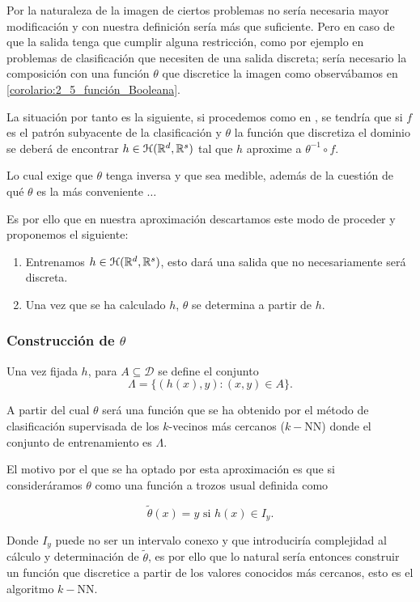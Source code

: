 Por la naturaleza de la imagen de ciertos problemas no sería 
necesaria mayor modificación y con nuestra definición sería 
más que suficiente. Pero en caso de que la salida tenga que cumplir alguna restricción, como por ejemplo en 
problemas de clasificación que necesiten de una salida discreta; sería necesario la composición con una función 
$\theta$ que discretice la imagen como observábamos en \ref{corolario:2_5_función_Booleana}.  


La situación por tanto es la siguiente, si procedemos como en , se tendría que si $f$ es el patrón subyacente de la clasificación y $\theta$ la función que discretiza el dominio se deberá de encontrar 
$h \in \mathcal{H}(\mathbb{R}^d,\mathbb{R}^s)$ tal que $h$ aproxime a $\theta^{-1} \circ f$.

Lo cual exige que $\theta$ tenga inversa y que sea medible, además de la cuestión de qué $\theta$ es la más conveniente $\dots$

\begin{aportacionOriginal} %
    
Es por ello que en nuestra aproximación descartamos este modo de proceder y proponemos el siguiente: 

\begin{enumerate}
    \item Entrenamos $h\in \mathcal{H}(\mathbb{R}^d,\mathbb{R}^s)$, esto dará una salida que no necesariamente será discreta. 
    \item Una vez que se ha calculado $h$,  $\theta$ se determina a partir de $h$. 
\end{enumerate}

\subsubsection*{Construcción de  $\theta$}

Una vez fijada $h$,  para $A \subseteq \mathcal{D}$ se define  el conjunto 
\begin{equation}
    \Lambda = \{(h(x), y) : (x,y) \in A\}.
\end{equation}

A partir del cual $\theta$ será una función que se ha obtenido por el método de clasificación supervisada de los $k$-vecinos más cercanos ($k-$NN) donde el conjunto de entrenamiento es $\Lambda$.

El motivo por el que se ha optado por esta aproximación es que si consideráramos $\theta$ como una función a trozos usual definida como 

\begin{equation}
    \tilde{\theta}(x) = y \text{ si } h(x) \in I_y.
\end{equation}

Donde $I_y$ puede no ser un intervalo conexo y que introduciría complejidad al cálculo y determinación de $\tilde{\theta}$, es por ello que lo natural sería entonces construir un función que discretice a partir de los valores conocidos más cercanos, esto es el algoritmo $k-$NN.  

\end{aportacionOriginal}  %


